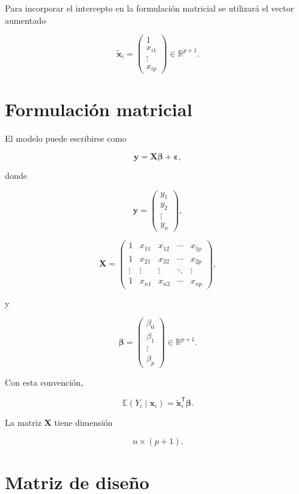 \documentclass[
  spanish,
  11pt,
  letterpaper,
  DIV=11,
  numbers=noendperiod]{scrreprt}
\theoremstyle{definition}
\theoremstyle{plain}
\theoremstyle{definition}
\theoremstyle{remark}
\begin{document}
Para incorporar el intercepto en la formulación matricial se utilizará
el vector aumentado

\[
\widetilde{\mathbf{x}}_i
=
\begin{pmatrix}
1\\
x_{i1}\\
\vdots\\
x_{ip}
\end{pmatrix}
\in\mathbb{R}^{p+1}.
\]

\section{Formulación matricial}\label{formulaciuxf3n-matricial}

El modelo puede escribirse como

\[
\mathbf{y}
=
\mathbf{X}\boldsymbol{\beta}
+
\boldsymbol{\varepsilon},
\]

donde

\[
\mathbf{y}
=
\begin{pmatrix}
y_1\\
y_2\\
\vdots\\
y_n
\end{pmatrix},
\]

\[
\mathbf{X}
=
\begin{pmatrix}
1 & x_{11} & x_{12} & \cdots & x_{1p}\\
1 & x_{21} & x_{22} & \cdots & x_{2p}\\
\vdots & \vdots & \vdots & \ddots & \vdots\\
1 & x_{n1} & x_{n2} & \cdots & x_{np}
\end{pmatrix},
\]

y

\[
\boldsymbol{\beta}
=
\begin{pmatrix}
\beta_0\\
\beta_1\\
\vdots\\
\beta_p
\end{pmatrix}
\in\mathbb{R}^{p+1}.
\]

Con esta convención,

\[
\mathbb{E}(Y_i\mid\mathbf{x}_i)
=
\widetilde{\mathbf{x}}_i^{\mathsf T}
\boldsymbol{\beta}.
\]

La matriz \(\mathbf{X}\) tiene dimensión

\[
n\times(p+1).
\]

\section{Matriz de diseño}\label{matriz-de-diseuxf1o}
\end{document}
